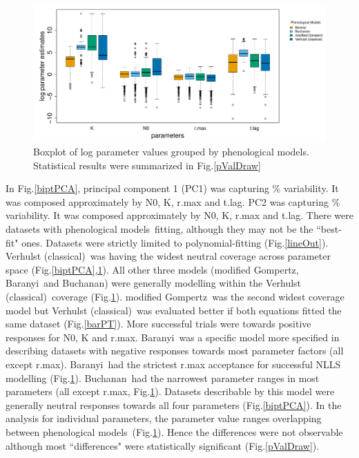 \documentclass[a4paper, 11pt]{article}
\newcommand{\pms}{phenological models}
\newcommand{\fve}{Verhulst (classical)}
\newcommand{\fgo}{modified Gompertz}
\newcommand{\fba}{Baranyi}
\newcommand{\fbu}{Buchanan}
\begin{document}
 \begin{figure}[H]
	\centering
	\includegraphics[width=\linewidth]{../results/Log_boxPerFac.pdf}
	\caption{Boxplot of log parameter values grouped by \pms.  Statistical results were summarized in Fig.\ref{pValDraw}}\label{boxFac}
\end{figure}
 In Fig.\ref{biptPCA}, principal component 1 (PC1) was capturing 
 \% variability.  It was composed approximately by 
  N0, 
  K, 
  r.max and 
  t.lag.  PC2 was capturing 
  \% variability.  It was composed approximately by 
  N0, 
  K, 
  r.max and 
  t.lag.  There were 
  datasets with \pms\ fitting, although they may not be the ``best-fit" ones.  Datasets 
  were strictly limited to polynomial-fitting (Fig.\ref{lineOut}).  \fve\ was having the widest neutral coverage across parameter space (Fig.\ref{biptPCA},\ref{boxFac}).  All other three models (\fgo, \fba\ and \fbu) were generally modelling within the \fve\ coverage (Fig.\ref{boxFac}).  \fgo\ was the second widest coverage model but \fve\ was evaluated better if both equations fitted the same dataset (Fig.\ref{barPT}).  More successful trials were towards positive responses for N0, K and r.max.  \fba\ was a specific model more specified in describing datasets with negative responses towards most parameter factors (all except r.max).  \fba\ had the strictest r.max acceptance for successful NLLS modelling (Fig.\ref{boxFac}).  \fbu\ had the narrowest parameter ranges in most parameters (all except r.max, Fig.\ref{boxFac}).  Datasets describable by this model were generally neutral responses towards all four parameters (Fig.\ref{biptPCA}).  In the analysis for individual parameters, the parameter value ranges overlapping between \pms\ (Fig.\ref{boxFac}).  Hence the differences were not observable although most ``differences" were statistically significant (Fig.\ref{pValDraw}).
\end{document}
